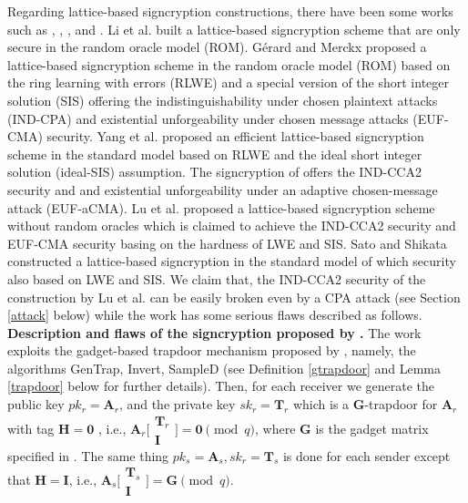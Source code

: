 \documentclass[a4paper,11pt,onecolumn]{elsarticle}
\begin{document}
	Regarding lattice-based signcryption constructions, there have been some works such as \cite{Lietal12},  \cite{GM18},  \cite{YCX19}, \cite{LWJ+14} and  \cite{SS18}.  Li et al. \cite{Lietal12} built a lattice-based signcryption scheme that are only secure in the random oracle model (ROM). Gérard  and Merckx  \cite{GM18}  proposed a lattice-based signcryption scheme in the random oracle model (ROM) based  on the ring learning with errors (RLWE) and a special version of the short integer solution (SIS) offering  the indistinguishability under chosen plaintext attacks (IND-CPA) and  existential unforgeability under chosen message attacks (EUF-CMA) security.  Yang et al. \cite{YCX19} proposed an efficient lattice-based signcryption scheme in the standard model based on RLWE and the ideal short integer solution (ideal-SIS) assumption. The  signcryption  of \cite{YCX19} offers the IND-CCA2 security and  and existential unforgeability under an adaptive chosen-message attack (EUF-aCMA).  Lu et al. \cite{LWJ+14} proposed a lattice-based signcryption scheme without random oracles which is claimed to  achieve  the IND-CCA2 security and EUF-CMA security basing on the hardness of  LWE and SIS. Sato and Shikata \cite{SS18} constructed a lattice-based signcryption in the standard model of which security also based on LWE and SIS. 
We claim that, the IND-CCA2 security of the construction by Lu et al. \cite{LWJ+14} can be easily broken even by a CPA attack (see Section \ref{attack} below) while the  work \cite{SS18} has some serious flaws described as follows. \\

	\noindent \textbf{Description and flaws of the signcryption proposed by  \cite{SS18}.}  The work  \cite{SS18} exploits the  gadget-based trapdoor mechanism proposed by \cite{MP12}, namely, the algorithms \textsf{GenTrap}, \textsf{Invert}, \textsf{SampleD} (see Definition \ref{gtrapdoor} and Lemma \ref{trapdoor} below for further details). Then, for each receiver we generate the public key 
		 $pk_r=\mathbf{A}_r$, and  the private key $sk_r=\textbf{T}_r$ which is a $\mathbf{G}$-trapdoor for $\mathbf{A}_r$  with tag $\mathbf{H}=\textbf{0}$ , i.e., $ \mathbf{A}_r\bigl[\begin{smallmatrix}
		 	 			\mathbf{T}_r\\ \textbf{I}
		 	 			\end{smallmatrix} \bigr] = \mathbf{0} \pmod q $, where $\textbf{G}$ is the gadget matrix specified in \cite[Section 4]{MP12}. The same thing $pk_s=\mathbf{A}_s, sk_r=\textbf{T}_s$ is done for each sender except that $\mathbf{H}=\textbf{I}$, i.e., $ \mathbf{A}_s\bigl[\begin{smallmatrix}
		 			\mathbf{T}_s\\ \textbf{I}
		 			\end{smallmatrix} \bigr] = \mathbf{G} \pmod q $. 
	
\end{document}
